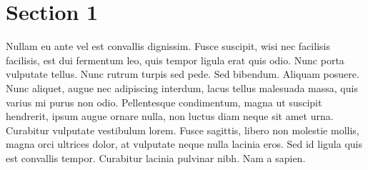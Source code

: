
\section{Section 1}

Nullam eu ante vel est convallis dignissim.  Fusce suscipit, wisi nec facilisis facilisis, est dui fermentum leo, quis tempor ligula erat quis odio.  Nunc porta vulputate tellus.  Nunc rutrum turpis sed pede.  Sed bibendum.  Aliquam posuere.  Nunc aliquet, augue nec adipiscing interdum, lacus tellus malesuada massa, quis varius mi purus non odio.  Pellentesque condimentum, magna ut suscipit hendrerit, ipsum augue ornare nulla, non luctus diam neque sit amet urna.  Curabitur vulputate vestibulum lorem.  Fusce sagittis, libero non molestie mollis, magna orci ultrices dolor, at vulputate neque nulla lacinia eros.  Sed id ligula quis est convallis tempor.  Curabitur lacinia pulvinar nibh.  Nam a sapien.
